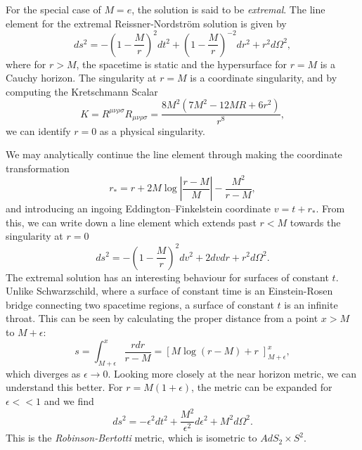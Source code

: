 For the special case of $M = e$, the solution is said to be \emph{extremal}. The line element for the extremal Reissner-Nordstr\"om solution is given by
\begin{equation}
\label{eq:ernle}
	ds^2 = - \left(1 - \frac{M}{r} \right)^2 dt^2 + \left(1 - \frac{M}{r} \right)^{-2} dr^2 + r^2 d\Omega^2,
\end{equation}
where for $r > M$, the spacetime is static and the hypersurface for $r = M$ is a Cauchy horizon. The singularity at $r = M$ is a coordinate singularity, and by computing the Kretschmann Scalar
\begin{equation*}
	K = R^{\mu \nu \rho \sigma} R_{\mu \nu \rho \sigma} = \frac{8M^2 (7M^2 - 12MR+ 6r^2) }{r^8},
\end{equation*} 
we can identify $r = 0$ as a physical singularity.  

We may analytically continue the line element through making the coordinate transformation
\begin{equation*}
	r_* = r + 2M \log \left| \frac{r - M}{M} \right| - \frac{M^2}{r - M},
\end{equation*}
and introducing an ingoing Eddington–Finkelstein coordinate $v = t + r_*$. From this, we can write down a line element which extends past $r < M$ towards the singularity at $r=0$
\begin{equation*}
	ds^2 = - \left(1 - \frac{M}{r} \right)^2 dv^2 + 2 dv dr + r^2 d\Omega^2.
\end{equation*}
The extremal solution has an interesting behaviour for surfaces of constant $t$. Unlike Schwarzschild, where a surface of constant time is an Einstein-Rosen bridge connecting two spacetime regions, a surface of constant $t$ is an infinite throat. This can be seen by calculating the proper distance from a point $x > M$ to $M + \epsilon$:
\begin{equation*}
	s = \int^x_{M+\epsilon} \frac{r dr}{r - M} = \left[ M \log (r-M)+r \; \right]_{M+\epsilon}^x,
\end{equation*} 
which diverges as $\epsilon \rightarrow 0$. Looking more closely at the near horizon metric, we can understand this better. For $r = M(1 + \epsilon)$, the metric  can be expanded for $\epsilon << 1$ and we find 
\begin{equation*}
	ds^2 = - \epsilon^2 dt^2 + \frac{M^2}{\epsilon^2} d\epsilon^2 + M^2 d\Omega^2.
\end{equation*}
This is the \emph{Robinson-Bertotti} metric, which is isometric to $AdS_2 \times S^2$. 

